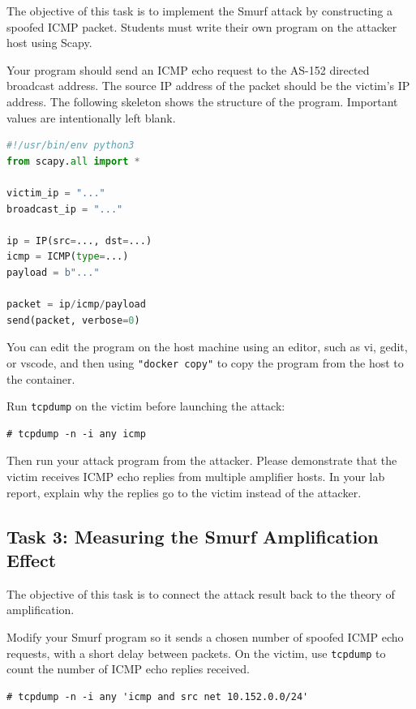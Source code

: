 The objective of this task is to implement the Smurf attack by constructing a
spoofed ICMP packet. Students must write their own program on the attacker host
using Scapy.

Your program should send an ICMP echo request to the AS-152 directed broadcast
address. The source IP address of the packet should be the victim's IP address.
The following skeleton shows the structure of the program. Important values are
intentionally left blank.

\begin{lstlisting}[language=python]
#!/usr/bin/env python3
from scapy.all import *

victim_ip = "..."
broadcast_ip = "..."

ip = IP(src=..., dst=...)
icmp = ICMP(type=...)
payload = b"..."

packet = ip/icmp/payload
send(packet, verbose=0)
\end{lstlisting}

You can edit the program on the host machine using an editor, such as 
vi, gedit, or vscode, and then using \texttt{"docker copy"} to 
copy the program from the host to the container. 


Run \texttt{tcpdump} on the victim before launching the attack:

\begin{lstlisting}
# tcpdump -n -i any icmp
\end{lstlisting}

Then run your attack program from the attacker. Please demonstrate that the
victim receives ICMP echo replies from multiple amplifier hosts. In your lab
report, explain why the replies go to the victim instead of the attacker.



\subsection{Task 3: Measuring the Smurf Amplification Effect}

The objective of this task is to connect the attack result back to the theory of
amplification.

Modify your Smurf program so it sends a chosen number of spoofed ICMP echo
requests, with a short delay between packets. On the victim, use
\texttt{tcpdump} to count the number of ICMP echo replies received.

\begin{lstlisting}
# tcpdump -n -i any 'icmp and src net 10.152.0.0/24'
\end{lstlisting}

